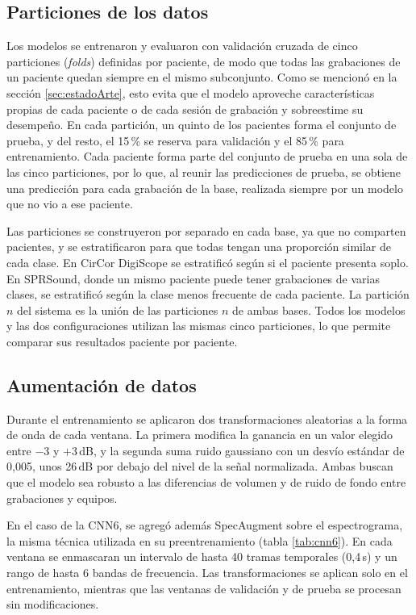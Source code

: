 \subsection{Particiones de los datos}
\label{subsec:particiones}

Los modelos se entrenaron y evaluaron con validación cruzada de cinco particiones (\textit{folds})
definidas por paciente, de modo que todas las grabaciones de un paciente quedan siempre en el
mismo subconjunto. Como se mencionó en la sección \ref{sec:estadoArte}, esto evita que el modelo
aproveche características propias de cada paciente o de cada sesión de grabación y sobreestime su
desempeño. En cada partición, un quinto de los pacientes forma el conjunto de prueba, y del resto,
el 15\,\% se reserva para validación y el 85\,\% para entrenamiento. Cada paciente forma parte del
conjunto de prueba en una sola de las cinco particiones, por lo que, al reunir las predicciones de
prueba, se obtiene una predicción para cada grabación de la base, realizada siempre por un modelo
que no vio a ese paciente.

Las particiones se construyeron por separado en cada base, ya que no comparten pacientes, y se
estratificaron para que todas tengan una proporción similar de cada clase. En CirCor DigiScope se
estratificó según si el paciente presenta soplo. En SPRSound, donde un mismo paciente puede tener
grabaciones de varias clases, se estratificó según la clase menos frecuente de cada paciente. La
partición $n$ del sistema es la unión de las particiones $n$ de ambas bases. Todos los modelos y
las dos configuraciones utilizan las mismas cinco particiones, lo que permite comparar sus
resultados paciente por paciente.

\subsection{Aumentación de datos}
\label{subsec:aumentacion}

Durante el entrenamiento se aplicaron dos transformaciones aleatorias a la forma de onda de cada
ventana. La primera modifica la ganancia en un valor elegido entre $-3$ y $+3$\,dB, y la segunda
suma ruido gaussiano con un desvío estándar de 0,005, unos 26\,dB por debajo del nivel de la
señal normalizada. Ambas buscan que el modelo sea robusto a las diferencias de volumen y de ruido
de fondo entre grabaciones y equipos.

En el caso de la CNN6, se agregó además SpecAugment \citep{park2019specaugment} sobre el
espectrograma, la misma técnica utilizada en su preentrenamiento (tabla \ref{tab:cnn6}). En cada
ventana se enmascaran un intervalo de hasta 40 tramas temporales (0,4\,s) y un rango de hasta 6
bandas de frecuencia. Las transformaciones se aplican solo en el entrenamiento, mientras que las
ventanas de validación y de prueba se procesan sin modificaciones.

